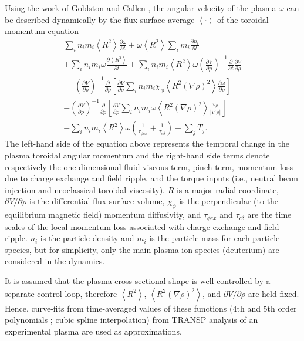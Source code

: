 \documentclass[12pt]{iopart}
\begin{document}
Using the work of Goldston \cite{Goldston86}  and Callen  \cite{Callen09}, the angular velocity of the plasma $\omega$ can be described dynamically by the flux surface average $\left<\cdot\right>$ of the toroidal momentum equation 
\begin{eqnarray}
  \sum_i n_i m_i \left<R^2\right> \frac{\partial \omega}{\partial t}
  + \omega \left<R^2\right> \sum_i m_i \frac{\partial n_i}{\partial t} \nonumber \\
  + \sum_i n_i m_i \omega \frac{\partial \left<R^2\right>}{\partial t}
  + \sum_i n_i m_i \left<R^2\right> \omega \left( \frac{\partial V}{\partial\rho}\right)^{-1} \frac{\partial}{\partial t} \frac{\partial V}{\partial \rho} \nonumber \\
  = \left( \frac{\partial V}{\partial\rho}\right)^{-1}\frac{\partial}{\partial \rho} \left[\frac{\partial V}{\partial \rho}\sum_i n_i m_i \chi_\phi \left< R^2 (\nabla \rho)^2\right> \frac{\partial\omega}{\partial\rho}\right] \nonumber \\
  - \left( \frac{\partial V}{\partial\rho}\right)^{-1}\frac{\partial}{\partial \rho} \left[\frac{\partial V}{\partial \rho}\sum_i n_i m_i \omega \left< R^2 (\nabla \rho)^2\right> \frac{v_\rho}{|\nabla\rho|}\right] \nonumber \\
  - \sum_i n_i m_i \left< R^2\right> \omega \left( \frac{1}{\tau_{\phi cx}} + \frac{1}{\tau_{c\delta}}\right) + \sum_j T_j.
\label{eq:full1}
\end{eqnarray}
The left-hand side of the equation above represents the temporal change in the plasma toroidal angular momentum and the right-hand side terms denote respectively the one-dimensional fluid viscous term, pinch term, momentum loss due to charge exchange and field ripple, and the torque inputs (i.e., neutral beam injection and neoclassical toroidal viscosity). $R$ is a major radial coordinate, $\partial V/\partial\rho$ is the differential flux surface volume, $\chi_\phi$ is the perpendicular (to the equilibrium magnetic field) momentum diffusivity, and $\tau_{\phi c x}$ and $\tau_{c\delta}$ are the time scales of the local momentum loss associated with charge-exchange and field ripple. $n_i$ is the particle density and $m_i$ is the particle mass for each particle species, but for simplicity, only the main plasma ion species (deuterium) are considered in the dynamics.

It is assumed that the plasma cross-sectional shape is well controlled by a separate control loop, therefore $\left< R^2 \right>$, $\left< R^2 (\nabla\rho)^2 \right>$, and $\partial V/\partial \rho$ are held fixed.  Hence, curve-fits from time-averaged values of these functions (4th and 5th order polynomials ; cubic spline interpolation) from TRANSP analysis of an experimental plasma are used as approximations.  
\end{document}
